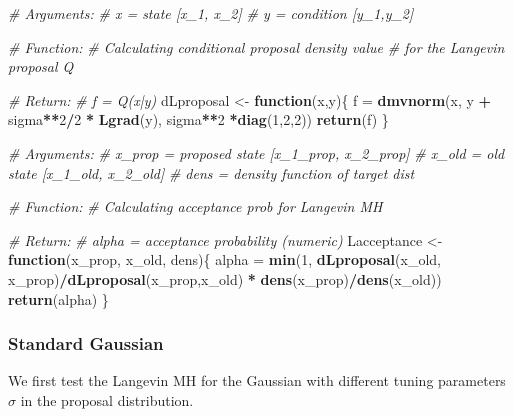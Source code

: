 \documentclass[
]{article}
\newenvironment{Shaded}{\begin{snugshade}}{\end{snugshade}}
\newcommand{\CommentTok}[1]{\textcolor[rgb]{0.56,0.35,0.01}{\textit{#1}}}
\newcommand{\ControlFlowTok}[1]{\textcolor[rgb]{0.13,0.29,0.53}{\textbf{#1}}}
\newcommand{\DecValTok}[1]{\textcolor[rgb]{0.00,0.00,0.81}{#1}}
\newcommand{\KeywordTok}[1]{\textcolor[rgb]{0.13,0.29,0.53}{\textbf{#1}}}
\newcommand{\NormalTok}[1]{#1}
\newcommand{\OperatorTok}[1]{\textcolor[rgb]{0.81,0.36,0.00}{\textbf{#1}}}
\newcommand{\StringTok}[1]{\textcolor[rgb]{0.31,0.60,0.02}{#1}}
\begin{document}
\begin{Shaded}
\begin{Highlighting}[]
\CommentTok{# Arguments: }
\CommentTok{# x = state [x_1, x_2]}
\CommentTok{# y = condition [y_1,y_2]}

\CommentTok{# Function:}
\CommentTok{# Calculating conditional proposal density value }
\CommentTok{# for the Langevin proposal Q}

\CommentTok{# Return:}
\CommentTok{# f = Q(x|y)}
\NormalTok{dLproposal <-}\StringTok{ }\ControlFlowTok{function}\NormalTok{(x,y)\{}
\NormalTok{  f =}\StringTok{ }\KeywordTok{dmvnorm}\NormalTok{(x, y }\OperatorTok{+}\StringTok{ }\NormalTok{sigma}\OperatorTok{**}\DecValTok{2}\OperatorTok{/}\DecValTok{2} \OperatorTok{*}\StringTok{ }\KeywordTok{Lgrad}\NormalTok{(y), sigma}\OperatorTok{**}\DecValTok{2} \OperatorTok{*}\KeywordTok{diag}\NormalTok{(}\DecValTok{1}\NormalTok{,}\DecValTok{2}\NormalTok{,}\DecValTok{2}\NormalTok{))}
  \KeywordTok{return}\NormalTok{(f)}
\NormalTok{\}}


\CommentTok{# Arguments: }
\CommentTok{# x_prop = proposed state [x_1_prop, x_2_prop]}
\CommentTok{# x_old = old state [x_1_old, x_2_old]}
\CommentTok{# dens = density function of target dist}

\CommentTok{# Function:}
\CommentTok{# Calculating acceptance prob for Langevin MH}

\CommentTok{# Return:}
\CommentTok{# alpha = acceptance probability (numeric)}
\NormalTok{Lacceptance <-}\StringTok{ }\ControlFlowTok{function}\NormalTok{(x_prop, x_old, dens)\{}
\NormalTok{  alpha =}\StringTok{ }\KeywordTok{min}\NormalTok{(}\DecValTok{1}\NormalTok{, }\KeywordTok{dLproposal}\NormalTok{(x_old, x_prop)}\OperatorTok{/}\KeywordTok{dLproposal}\NormalTok{(x_prop,x_old) }\OperatorTok{*}\StringTok{ }\KeywordTok{dens}\NormalTok{(x_prop)}\OperatorTok{/}\KeywordTok{dens}\NormalTok{(x_old))}
  \KeywordTok{return}\NormalTok{(alpha)}
\NormalTok{\}}
\end{Highlighting}
\end{Shaded}

\hypertarget{standard-gaussian-1}{%
\subsubsection{Standard Gaussian}\label{standard-gaussian-1}}

We first test the Langevin MH for the Gaussian with different tuning
parameters \(\sigma\) in the proposal distribution.
\end{document}
